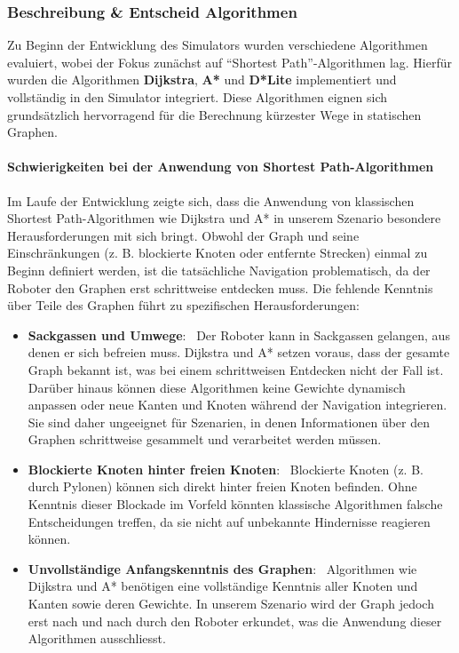 \documentclass[main.tex]{subfiles} %
\begin{document}
\subsubsection{Beschreibung \& Entscheid Algorithmen}

Zu Beginn der Entwicklung des Simulators wurden verschiedene
Algorithmen evaluiert, wobei der Fokus zunächst auf \enquote{Shortest
Path}-Algorithmen lag. Hierfür wurden die Algorithmen
\textbf{Dijkstra}, \textbf{A*} und \textbf{D*Lite} implementiert und
vollständig in den Simulator integriert. Diese Algorithmen eignen
sich grundsätzlich hervorragend für die Berechnung kürzester Wege in
statischen Graphen.

\paragraph{Schwierigkeiten bei der Anwendung von Shortest Path-Algorithmen}

Im Laufe der Entwicklung zeigte sich, dass die Anwendung von klassischen 
Shortest Path-Algorithmen wie Dijkstra und A* in unserem Szenario besondere 
Herausforderungen mit sich bringt. Obwohl der Graph und seine Einschränkungen 
(z. B. blockierte Knoten oder entfernte Strecken) einmal zu Beginn definiert 
werden, ist die tatsächliche Navigation problematisch, da der Roboter den 
Graphen erst schrittweise entdecken muss. Die fehlende Kenntnis über Teile 
des Graphen führt zu spezifischen Herausforderungen:

\begin{itemize}
  \item \textbf{Sackgassen und Umwege}: \
  Der Roboter kann in Sackgassen gelangen, aus denen er sich befreien muss. 
  Dijkstra und A* setzen voraus, dass der gesamte Graph bekannt ist, was 
  bei einem schrittweisen Entdecken nicht der Fall ist. Darüber hinaus können 
  diese Algorithmen keine Gewichte dynamisch anpassen oder neue Kanten und 
  Knoten während der Navigation integrieren. Sie sind daher ungeeignet für 
  Szenarien, in denen Informationen über den Graphen schrittweise gesammelt 
  und verarbeitet werden müssen.

  \item \textbf{Blockierte Knoten hinter freien Knoten}: \
  Blockierte Knoten (z. B. durch Pylonen) können sich direkt hinter freien 
  Knoten befinden. Ohne Kenntnis dieser Blockade im Vorfeld könnten klassische 
  Algorithmen falsche Entscheidungen treffen, da sie nicht auf unbekannte 
  Hindernisse reagieren können.

  \item \textbf{Unvollständige Anfangskenntnis des Graphen}: \
  Algorithmen wie Dijkstra und A* benötigen eine vollständige Kenntnis aller 
  Knoten und Kanten sowie deren Gewichte. In unserem Szenario wird der Graph 
  jedoch erst nach und nach durch den Roboter erkundet, was die Anwendung 
  dieser Algorithmen ausschliesst.
\end{itemize}
\end{document}
